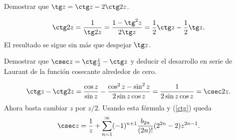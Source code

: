 \begin{ejercicio} \label{ej.tangente} Demostrar que $\tg z=\ctg z-2\ctg 2z$.
\end{ejercicio}

\begin{solucion}
$$\ctg 2z=\frac{1}{\tg 2z}=\frac{1-\tg^2 z}{2\tg z}=
\frac{1}{2}\ctg z-\frac{1}{2}\tg z.$$
El resultado se sigue sin m\'as que despejar $\tg z$.
\end{solucion}

\begin{ejercicio}\label{EjercicioCosecante} Demostrar que $\csec z=\ctg \frac{z}{2}-\ctg z$ y deducir el desarrollo en serie de Laurant de la funci\'on cosecante alrededor de cero.
\end{ejercicio}

\begin{solucion}
$$\ctg z-\ctg 2z=\frac{\cos z}{\sin z}-\frac{\cos^2z-\sin^2z}{2\sin z\cos z}=\frac{1}{2\sin z\cos z}=\csec 2z.$$
Ahora basta cambiar $z$ por $z/2$. Usando esta f\'ormula y (\ref{ctg}) queda
$$\csec z=\frac{1}{z}+\sum_{n=1}^\infty (-1)^{n+1}\frac{b_{2n}}{(2n)!}(2^{2n}-2)z^{2n-1}.$$
\end{solucion} 